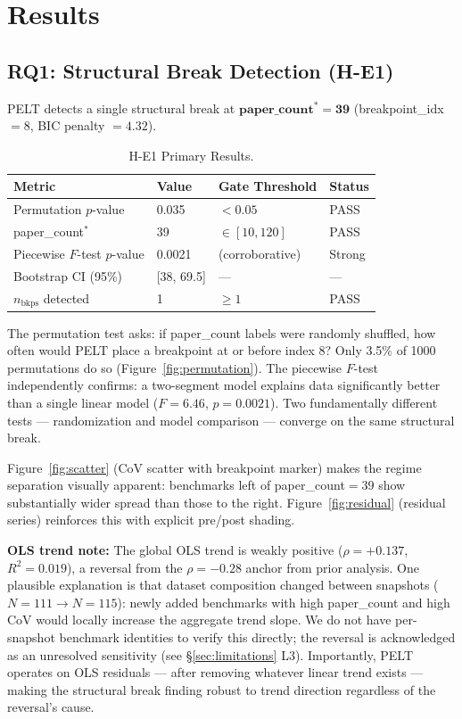 \section{Results}
\label{sec:results}

\subsection{RQ1: Structural Break Detection (H-E1)}

PELT detects a single structural break at $\mathbf{\text{paper\_count}^* = 39}$ (breakpoint\_idx $= 8$, BIC penalty $= 4.32$).

\begin{table}[h]
\centering
\caption{H-E1 Primary Results.}
\label{tab:he1}
\begin{tabular}{llll}
\toprule
Metric & Value & Gate Threshold & Status \\
\midrule
Permutation $p$-value & 0.035 & $< 0.05$ & PASS \\
paper\_count$^*$ & 39 & $\in [10, 120]$ & PASS \\
Piecewise $F$-test $p$-value & 0.0021 & (corroborative) & Strong \\
Bootstrap CI (95\%) & [38, 69.5] & --- & --- \\
$n_{\text{bkps}}$ detected & 1 & $\geq 1$ & PASS \\
\bottomrule
\end{tabular}
\end{table}

The permutation test asks: if paper\_count labels were randomly shuffled, how often would PELT place a breakpoint at or before index 8? Only 3.5\% of 1000 permutations do so (Figure~\ref{fig:permutation}). The piecewise $F$-test independently confirms: a two-segment model explains data significantly better than a single linear model ($F=6.46$, $p=0.0021$). Two fundamentally different tests --- randomization and model comparison --- converge on the same structural break.

Figure~\ref{fig:scatter} (CoV scatter with breakpoint marker) makes the regime separation visually apparent: benchmarks left of paper\_count$=39$ show substantially wider spread than those to the right. Figure~\ref{fig:residual} (residual series) reinforces this with explicit pre/post shading.

\textbf{OLS trend note:} The global OLS trend is weakly positive ($\rho = +0.137$, $R^2=0.019$), a reversal from the $\rho=-0.28$ anchor from prior analysis. One plausible explanation is that dataset composition changed between snapshots ($N=111 \to N=115$): newly added benchmarks with high paper\_count and high CoV would locally increase the aggregate trend slope. We do not have per-snapshot benchmark identities to verify this directly; the reversal is acknowledged as an unresolved sensitivity (see \S\ref{sec:limitations} L3). Importantly, PELT operates on OLS residuals --- after removing whatever linear trend exists --- making the structural break finding robust to trend direction regardless of the reversal's cause.

